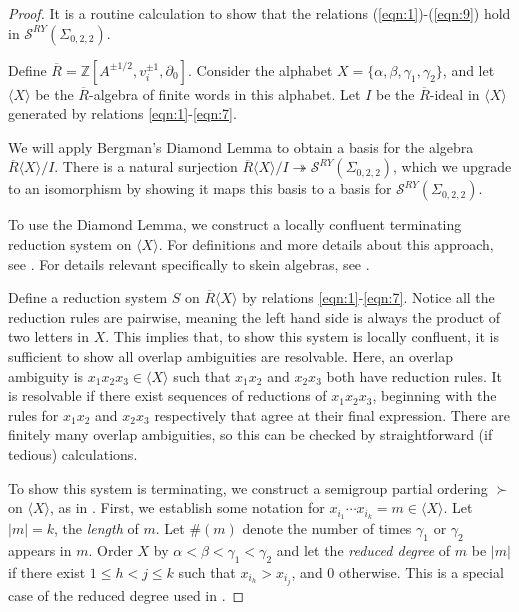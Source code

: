 \documentclass{article}
\newcommand{\del}{\partial}
\newcommand{\Z}{\mathbb{Z}}
\newcommand{\onto}{\twoheadrightarrow}
\renewcommand{\a}{\alpha}
\renewcommand{\b}{\beta}
\newcommand{\g}{\gamma}
\renewcommand{\S}{\mathcal{S}}
\newcommand{\SRY}{\mathcal{S}^{RY}}
\newcommand{\san}{\Sigma_{0,2,2}}
\theoremstyle{definition}
\renewcommand{\g}{\gamma}
\renewcommand{\a}{\alpha}
\renewcommand{\b}{\beta}
\renewcommand{\san}{\Sigma_{0, 2, 2}}
\renewcommand{\SRY}{\ensuremath{ \mathcal S^{RY}}}
\begin{document}
\begin{proof}   It is a routine calculation to show that the relations (\ref{eqn:1})-(\ref{eqn:9}) hold in $\S^{RY}(\Sigma_{0,2,2})$. 

Define $\overline{R}=\Z[A^{\pm1/2},v_i^{\pm1},\del_0]$. Consider the alphabet $X=\{\a,\b ,\g_1,\g_2\}$, and let $\langle X\rangle$ be the $\overline{R}$-algebra of finite words in this alphabet. Let $I$ be the $\overline{R}$-ideal in $\langle X\rangle$ generated by relations \eqref{eqn:1}-\eqref{eqn:7}. 

We will apply Bergman's Diamond Lemma \cite{DiamondLemma} to obtain a basis for the algebra $\overline{R}\langle X\rangle/I$. There is a natural surjection $\overline{R}\langle X\rangle/I\onto \SRY(\san)$, which we upgrade to an isomorphism by showing it maps this basis to a basis for $\SRY(\san)$.

To use the Diamond Lemma, we construct a locally confluent terminating reduction system on $\langle X\rangle$. For definitions and more details about this approach, see \cite{DiamondLemma}. For details relevant specifically to skein algebras, see \cite[Section~9]{CookeAskeyWilson}. 

Define a reduction system $S$ on $\overline{R}\langle X\rangle $ by relations \eqref{eqn:1}-\eqref{eqn:7}. Notice all the reduction rules are pairwise, meaning the left hand side is always the product of two letters in $X$. This implies that, to show this system is locally confluent, it is sufficient to show all overlap ambiguities are resolvable.  Here, an overlap ambiguity is $x_1x_2x_3\in \langle X\rangle$ such that $x_1x_2$ and $x_2x_3$ both have reduction rules. It is resolvable if there exist sequences of reductions of $x_1x_2x_3$, beginning with the rules for $x_1x_2$ and $x_2x_3$ respectively that agree at their final expression. There are finitely many overlap ambiguities, so this can be checked by straightforward (if tedious) calculations.

To show this system is terminating, we construct a semigroup partial ordering $\succ$ on $\langle X\rangle$, as in \cite{CookeAskeyWilson}.
First, we establish some notation for $x_{i_1}\cdots x_{i_k}=m\in \langle X\rangle$. Let $|m|=k$, the \textit{length} of $m$. Let $\#(m)$ denote the number of times $\g_1$ or $\g_2$ appears in $m$. Order $X$ by $\a<\b<\g_1<\g_2$ and let the \textit{reduced degree} of $m$ be $|m|$ if there exist $1\leq h<j\leq k$ such that $x_{i_h}>x_{i_j}$, and 0 otherwise. This is a special case of the reduced degree used in \cite{CookeGenus2}. 


\end{proof}
\end{document}
